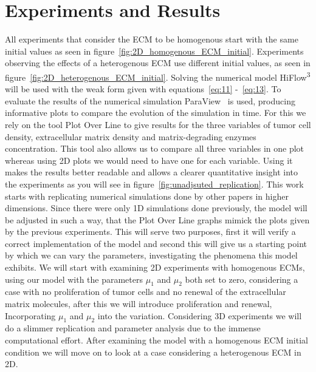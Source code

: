 

\section{Experiments and Results}
\label{sec:experiments}

All experiments that consider the ECM to be homogenous start with the same initial values as seen in figure~\ref{fig:2D_homogenous_ECM_initial}. Experiments observing the effects of a heterogenous ECM use different initial values, as seen in figure~\ref{fig:2D_heterogenous_ECM_initial}.\newline 
Solving the numerical model HiFlow\textsuperscript{3} will be used with the weak form given with equations~\ref{eq:11} -~\ref{eq:13}. To evaluate the results of the numerical simulation ParaView~\cite{paraview} is used, producing informative plots to compare the evolution of the simulation in time. For this we rely on the tool Plot Over Line to give results for the three variables of tumor cell density, extracellular matrix density and matrix-degrading enzymes concentration. This tool also allows us to compare all three variables in one plot whereas using 2D plots we would need to have one for each variable. Using it makes the results better readable and allows a clearer quantitative insight into the experiments as you will see in figure~\ref{fig:unadjsuted_replication}.\newline
This work starts with replicating numerical simulations done by other papers in higher dimensions. Since there were only 1D simulations done previously, the model will be adjusted in such a way, that the Plot Over Line graphs mimick the plots given by the previous experiments. This will serve two purposes, first it will verify a correct implementation of the model and second this will give us a starting point by which we can vary the parameters, investigating the phenomena this model exhibits. \newline 
We will start with examining 2D experiments with homogenous ECMs, using our model with the parameters $\mu_1$ and $\mu_2$ both set to zero, considering a case with no proliferation of tumor cells and no renewal of the extracellular matrix molecules, after this we will introduce proliferation and renewal, Incorporating $\mu_1$ and $\mu_2$ into the variation.
Considering 3D experiments we will do a slimmer replication and parameter analysis due to the immense computational effort. After examining the model with a homogenous ECM initial condition we will move on to look at a case considering a heterogenous ECM in 2D.\newline
